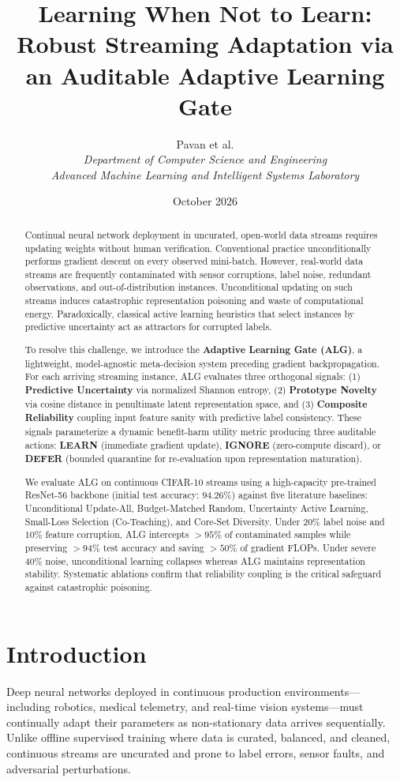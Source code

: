 \documentclass[journal,10pt,twocolumn]{article}
\title{\textbf{Learning When Not to Learn: Robust Streaming Adaptation via an Auditable Adaptive Learning Gate}}
\author{Pavan et al.\\
\textit{Department of Computer Science and Engineering}\\
\textit{Advanced Machine Learning and Intelligent Systems Laboratory}}
\date{October 2026}
\begin{document}
\maketitle

\begin{abstract}
Continual neural network deployment in uncurated, open-world data streams requires updating weights without human verification. Conventional practice unconditionally performs gradient descent on every observed mini-batch. However, real-world data streams are frequently contaminated with sensor corruptions, label noise, redundant observations, and out-of-distribution instances. Unconditional updating on such streams induces catastrophic representation poisoning and waste of computational energy. Paradoxically, classical active learning heuristics that select instances by predictive uncertainty act as attractors for corrupted labels.

To resolve this challenge, we introduce the \textbf{Adaptive Learning Gate (ALG)}, a lightweight, model-agnostic meta-decision system preceding gradient backpropagation. For each arriving streaming instance, ALG evaluates three orthogonal signals: (1) \textbf{Predictive Uncertainty} via normalized Shannon entropy, (2) \textbf{Prototype Novelty} via cosine distance in penultimate latent representation space, and (3) \textbf{Composite Reliability} coupling input feature sanity with predictive label consistency. These signals parameterize a dynamic benefit-harm utility metric producing three auditable actions: \textbf{LEARN} (immediate gradient update), \textbf{IGNORE} (zero-compute discard), or \textbf{DEFER} (bounded quarantine for re-evaluation upon representation maturation).

We evaluate ALG on continuous CIFAR-10 streams using a high-capacity pre-trained ResNet-56 backbone (initial test accuracy: $94.26\%$) against five literature baselines: Unconditional Update-All, Budget-Matched Random, Uncertainty Active Learning, Small-Loss Selection (Co-Teaching), and Core-Set Diversity. Under $20\%$ label noise and $10\%$ feature corruption, ALG intercepts $>95\%$ of contaminated samples while preserving $>94\%$ test accuracy and saving $>50\%$ of gradient FLOPs. Under severe $40\%$ noise, unconditional learning collapses whereas ALG maintains representation stability. Systematic ablations confirm that reliability coupling is the critical safeguard against catastrophic poisoning.
\end{abstract}

\section{Introduction}
Deep neural networks deployed in continuous production environments—including robotics, medical telemetry, and real-time vision systems—must continually adapt their parameters as non-stationary data arrives sequentially. Unlike offline supervised training where data is curated, balanced, and cleaned, continuous streams are uncurated and prone to label errors, sensor faults, and adversarial perturbations.
\end{document}
